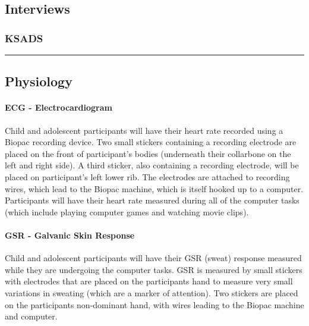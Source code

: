 \documentclass[]{book}
\let\oldparagraph\paragraph
\renewcommand{\paragraph}[1]{\oldparagraph{#1}\mbox{}}
\begin{document}
\hypertarget{interviews}{%
\subsection{Interviews}\label{interviews}}

\hypertarget{ksads}{%
\subsubsection{KSADS}\label{ksads}}

\begin{center}\rule{0.5\linewidth}{0.5pt}\end{center}

\hypertarget{physiology}{%
\subsection{Physiology}\label{physiology}}

\hypertarget{ecg---electrocardiogram}{%
\paragraph{ECG - Electrocardiogram}\label{ecg---electrocardiogram}}

Child and adolescent participants will have their heart rate recorded using a Biopac recording device. Two small stickers containing a recording electrode are placed on the front of participant's bodies (underneath their collarbone on the left and right side). A third sticker, also containing a recording electrode, will be placed on participant's left lower rib. The electrodes are attached to recording wires, which lead to the Biopac machine, which is itself hooked up to a computer. Participants will have their heart rate measured during all of the computer tasks (which include playing computer games and watching movie clips).

\hypertarget{gsr---galvanic-skin-response}{%
\paragraph{GSR - Galvanic Skin Response}\label{gsr---galvanic-skin-response}}

Child and adolescent participants will have their GSR (sweat) response measured while they are undergoing the computer tasks. GSR is measured by small stickers with electrodes that are placed on the participants hand to measure very small variations in sweating (which are a marker of attention). Two stickers are placed on the participants non-dominant hand, with wires leading to the Biopac machine and computer.
\end{document}
